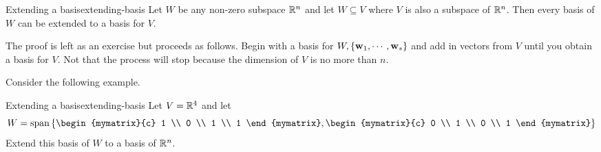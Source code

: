 \begin{theorem}{Extending a basis}{extending-basis}
Let $W$ be any non-zero subspace $\mathbb{R}^{n}$ and let $W\subseteq V$
where $V$ is also a subspace of $\mathbb{R}^{n}$. Then every basis of $W$
can be extended to a basis for $V$.
\end{theorem}

The proof is left as an exercise but proceeds as follows. Begin with a basis for $W,\left\{\mbox{\bf w}_{1},\cdots ,\mbox{\bf w}_{s}\right\} $ and add in vectors from $V$ until you obtain a basis for $V$.
Not that the process will stop because the dimension of $V$ is no more than $n$. 

Consider the following example.

\begin{example}{Extending a basis}{extending-basis}
Let $V=\mathbb{R}^{4}$ and let 
\begin{equation*}
W=\func{span}\set{\begin{mymatrix}{c}
1 \\ 
0 \\ 
1 \\ 
1
\end{mymatrix} ,\begin{mymatrix}{c}
0 \\ 
1 \\ 
0 \\ 
1
\end{mymatrix} }
\end{equation*}
Extend this basis of $W$ to a basis of $\mathbb{R}^{n}$.
\end{example}

